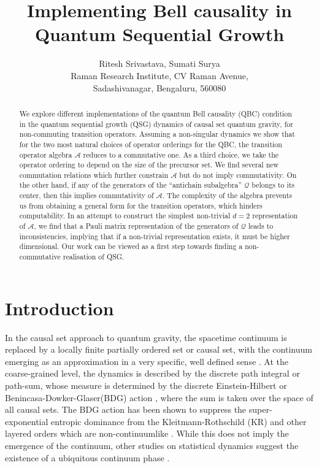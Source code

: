 \documentclass[11pt]{article}
\date{}
\title{Implementing Bell causality  in  Quantum Sequential Growth}
\author{Ritesh Srivastava, Sumati Surya \\ Raman Research Institute,
  CV Raman Avenue, \\ Sadashivanagar, Bengaluru, 560080}
\newcommand{\cA}{\mathcal A}
\newcommand{\cQ}{\mathcal Q}
\begin{document}
\maketitle
\begin{abstract}
We explore different  implementations of the quantum Bell causality (QBC)  condition 
in  the quantum sequential growth (QSG) dynamics of causal set quantum
gravity, for 
non-commuting transition operators. Assuming a non-singular dynamics we show that for the
two most natural choices of operator orderings for the  QBC, the
transition operator algebra $\cA$ reduces to a 
commutative one. As a third choice, we take the operator ordering to
depend on the size of the precursor set. We find several new
commutation relations which further constrain $\cA$ but 
do not imply commutativity. On the other hand, if any of the
generators of the  ``antichain 
subalgebra''  $\cQ$  belongs to its center, then this implies
commutativity of $\cA$.  The complexity of the algebra prevents us
from obtaining a general form for the transition
operators, which hinders computability. In an attempt to construct 
the simplest non-trivial  $d=2$ representation of $\cA$, we find  that
a Pauli matrix representation of the generators of $\cQ$ leads to
inconsistencies, implying that if a non-trivial representation exists,
it must be  higher dimensional. 
Our work can be viewed as a first step
towards finding a 
non-commutative realisation of QSG. 
\end{abstract}   

\thispagestyle{empty}
 \setcounter{page}{1}
 \section{Introduction}

In the causal set approach to quantum gravity, the  spacetime continuum is replaced by a locally finite partially
  ordered set or causal set, with the continuum emerging as an
  approximation in a 
  very specific, well defined sense \cite{blms,lr,book}.  At the
  coarse-grained level, the dynamics is described by the discrete path
  integral or path-sum, whose measure is determined by the discrete
  Einstein-Hilbert or Benincasa-Dowker-Glaser(BDG)  action
  \cite{bd,dg,glaser}, where the sum is taken over the space of all
  causal sets.  The BDG action has been shown to
  suppress the super-exponential entropic dominance from
 the Kleitmann-Rothschild (KR) and
  other layered orders \cite{kr,dharone,pst} which are
  non-continuumlike \cite{lc,ams,ccsone,ccstwo}. While this does not
  imply the emergence of the continuum, other studies on statistical
  dynamics suggest the existence of a ubiquitous continuum phase
  \cite{2dqg,hh,fss,2dcyl}. 
\end{document}
